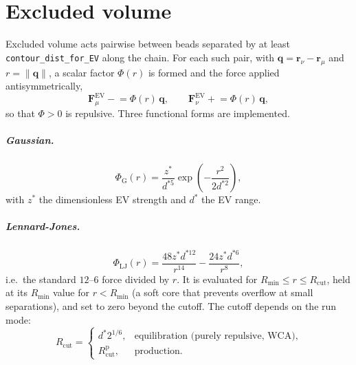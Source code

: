 \documentclass[11pt,a4paper]{report}
\newcommand{\code}[1]{\texttt{\seqsplitcode{#1}}}
\newcommand{\seqsplitcode}[1]{#1}
\begin{document}
\chapter{Excluded volume}
\label{ch:ev}

Excluded volume acts pairwise between beads separated by at least
\code{contour\_dist\_for\_EV} along the chain. For each such pair, with
$\bm{q} = \bm{r}_\nu-\bm{r}_\mu$ and $r = \|\bm{q}\|$, a scalar factor
$\Phi(r)$ is formed and the force applied antisymmetrically,
\begin{equation}
  \bm{F}^{\mathrm{EV}}_\mu \mathrel{-}= \Phi(r)\,\bm{q},
  \qquad
  \bm{F}^{\mathrm{EV}}_\nu \mathrel{+}= \Phi(r)\,\bm{q},
\end{equation}
so that $\Phi > 0$ is repulsive. Three functional forms are implemented.

\paragraph{Gaussian.}
\begin{equation}
  \Phi_{\mathrm{G}}(r) = \frac{z^{*}}{d^{*5}}\exp\!\left(-\frac{r^{2}}{2d^{*2}}\right),
\end{equation}
with $z^{*}$ the dimensionless EV strength and $d^{*}$ the EV range.

\paragraph{Lennard-Jones.}
\begin{equation}
  \Phi_{\mathrm{LJ}}(r) = \frac{48 z^{*} d^{*12}}{r^{14}} - \frac{24 z^{*} d^{*6}}{r^{8}},
\end{equation}
i.e.\ the standard $12$--$6$ force divided by $r$. It is evaluated for
$R_{\min} \le r \le R_{\mathrm{cut}}$, held at its $R_{\min}$ value for
$r < R_{\min}$ (a soft core that prevents overflow at small separations), and set
to zero beyond the cutoff. The cutoff depends on the run mode:
\begin{equation}
  R_{\mathrm{cut}} =
  \begin{cases}
    d^{*}2^{1/6}, & \text{equilibration (purely repulsive, WCA)},\\
    R_{\mathrm{cut}}^{\mathrm{p}}, & \text{production.}
  \end{cases}
\end{equation}
\end{document}
